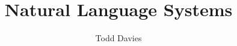 \newcommand{\coursename}{Natural Language Systems}
\newcommand{\coursecode}{COMP34411}
\newcommand{\courseinfo}{}
\newcommand{\Author}{Todd Davies} 
\newcommand{\Title}{Natural Language Systems}
\author{\Author}
\title{\Title}
